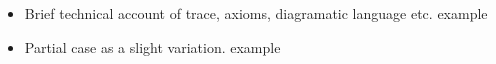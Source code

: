 \begin{itemize}
	\item Brief technical account of trace, axioms, diagramatic language etc. example
	\item Partial case as a slight variation. example
\end{itemize}

